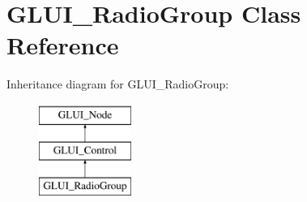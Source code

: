 \hypertarget{classGLUI__RadioGroup}{\section{G\-L\-U\-I\-\_\-\-Radio\-Group Class Reference}
\label{classGLUI__RadioGroup}
}
Inheritance diagram for G\-L\-U\-I\-\_\-\-Radio\-Group\-:\begin{figure}[H]
\begin{center}
\leavevmode
\includegraphics[height=3.000000cm]{classGLUI__RadioGroup}
\end{center}
\end{figure}
